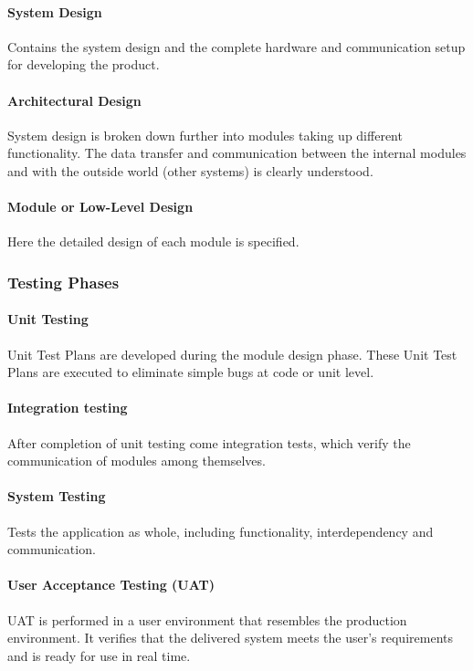 \documentclass[main.tex]{subfiles}
\begin{document}
\paragraph{System Design}
Contains the system design and the complete hardware and communication setup for developing the product.

\paragraph{Architectural Design}
System design is broken down further into modules taking up different functionality. The data transfer and communication between the internal modules and with the outside world (other systems) is clearly understood.

\paragraph{Module or Low-Level Design} Here the detailed design of each module is specified.

\subsubsection{Testing Phases}

\paragraph{Unit Testing}
Unit Test Plans are developed during the module design phase. These Unit Test Plans are executed to eliminate simple bugs at code or unit level.

\paragraph{Integration testing}
After completion of unit testing come integration tests, which verify the communication of modules among themselves.

\paragraph{System Testing}
Tests the application as whole, including functionality, interdependency and communication.

\paragraph{User Acceptance Testing (UAT)}
UAT is performed in a user environment that resembles the production environment. It verifies that the delivered system meets the user’s requirements and is ready for use in real time.
\end{document}
